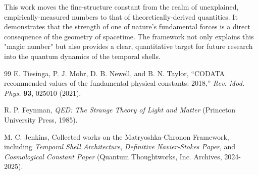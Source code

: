 \documentclass[11pt,a4paper]{article}
\begin{document}
This work moves the fine-structure constant from the realm of unexplained, empirically-measured numbers to that of theoretically-derived quantities. It demonstrates that the strength of one of nature's fundamental forces is a direct consequence of the geometry of spacetime. The framework not only explains this "magic number" but also provides a clear, quantitative target for future research into the quantum dynamics of the temporal shells.

\begin{thebibliography}{99}
    E. Tiesinga, P. J. Mohr, D. B. Newell, and B. N. Taylor, ``CODATA recommended values of the fundamental physical constants: 2018,'' \textit{Rev. Mod. Phys.} \textbf{93}, 025010 (2021).
    
    R. P. Feynman, \textit{QED: The Strange Theory of Light and Matter} (Princeton University Press, 1985).
    
    M. C. Jenkins, Collected works on the Matryoshka-Chronon Framework, including \textit{Temporal Shell Architecture}, \textit{Definitive Navier-Stokes Paper}, and \textit{Cosmological Constant Paper} (Quantum Thoughtworks, Inc. Archives, 2024-2025).
\end{thebibliography}
\end{document}
